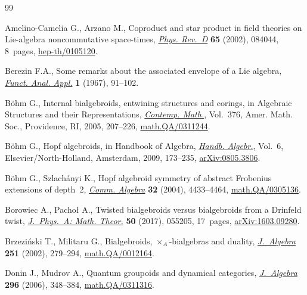\begin{thebibliography}{99}
\footnotesize\itemsep=0pt

Amelino-Camelia G., Arzano M., Coproduct and star product in field theories on
 {L}ie-algebra noncommutative space-times, \href{https://doi.org/10.1103/PhysRevD.65.084044}{\textit{Phys. Rev.~D}} \textbf{65}
 (2002), 084044, 8~pages, \href{https://arxiv.org/abs/hep-th/0105120}{hep-th/0105120}.

Berezin F.A., Some remarks about the associated envelope of a {L}ie algebra,
 \href{https://doi.org/10.1007/BF01076082}{\textit{Funct. Anal. Appl.}} \textbf{1} (1967), 91--102.

B\"ohm G., Internal bialgebroids, entwining structures and corings, in
 Algebraic Structures and their Representations, \href{https://doi.org/10.1090/conm/376/06959}{\textit{Contemp. Math.}}, Vol.~376, Amer. Math. Soc., Providence, RI, 2005, 207--226, \href{https://arxiv.org/abs/math.QA/0311244}{math.QA/0311244}.

B\"ohm G., Hopf algebroids, in Handbook of Algebra, \href{https://doi.org/10.1016/S1570-7954(08)00205-2}{\textit{Handb.
 Algebr.}}, Vol.~6, Elsevier/North-Holland, Amsterdam, 2009, 173--235,
 \href{https://arxiv.org/abs/0805.3806}{arXiv:0805.3806}.

B\"ohm G., Szlach\'anyi K., Hopf algebroid symmetry of abstract {F}robenius
 extensions of depth~2, \href{https://doi.org/10.1081/AGB-200034171}{\textit{Comm. Algebra}} \textbf{32} (2004), 4433--4464,
 \href{https://arxiv.org/abs/math.QA/0305136}{math.QA/0305136}.

Borowiec A., Pacho{\l} A., Twisted bialgebroids versus bialgebroids from a
 {D}rinfeld twist, \href{https://doi.org/10.1088/1751-8121/50/5/055205}{\textit{J.~Phys.~A: Math. Theor.}} \textbf{50} (2017),
 055205, 17~pages, \href{https://arxiv.org/abs/1603.09280}{arXiv:1603.09280}.

Brzezi\'nski T., Militaru G., Bialgebroids, {$\times_A$}-bialgebras and
 duality, \href{https://doi.org/10.1006/jabr.2001.9101}{\textit{J.~Algebra}} \textbf{251} (2002), 279--294,
 \href{https://arxiv.org/abs/math.QA/0012164}{math.QA/0012164}.

Donin J., Mudrov A., Quantum groupoids and dynamical categories,
 \href{https://doi.org/10.1016/j.jalgebra.2006.01.001}{\textit{J.~Algebra}} \textbf{296} (2006), 348--384, \href{https://arxiv.org/abs/math.QA/0311316}{math.QA/0311316}.


\end{thebibliography}
